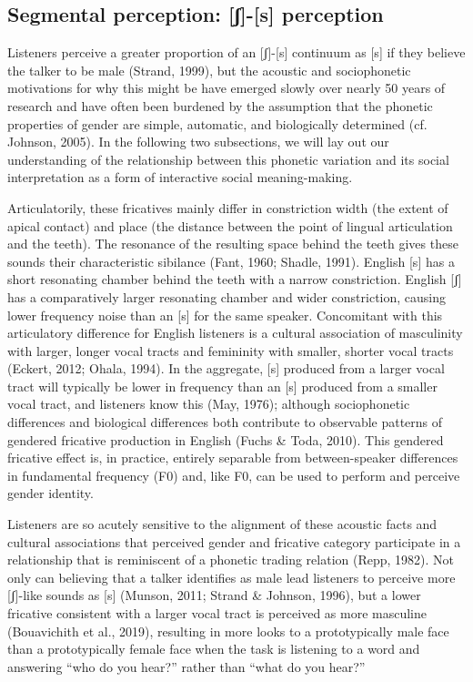 \documentclass[
  letterpaper,
  DIV=11,
  numbers=noendperiod]{scrartcl}
\begin{document}
\subsection{Segmental perception: {[}ʃ{]}-{[}s{]}
perception}\label{sec-fricative-gender}

Listeners perceive a greater proportion of an {[}ʃ{]}-{[}s{]} continuum
as {[}s{]} if they believe the talker to be male (Strand, 1999), but the
acoustic and sociophonetic motivations for why this might be have
emerged slowly over nearly 50 years of research and have often been
burdened by the assumption that the phonetic properties of gender are
simple, automatic, and biologically determined (cf. Johnson, 2005). In
the following two subsections, we will lay out our understanding of the
relationship between this phonetic variation and its social
interpretation as a form of interactive social meaning-making.

Articulatorily, these fricatives mainly differ in constriction width
(the extent of apical contact) and place (the distance between the point
of lingual articulation and the teeth). The resonance of the resulting
space behind the teeth gives these sounds their characteristic sibilance
(Fant, 1960; Shadle, 1991). English {[}s{]} has a short resonating
chamber behind the teeth with a narrow constriction. English {[}ʃ{]} has
a comparatively larger resonating chamber and wider constriction,
causing lower frequency noise than an {[}s{]} for the same speaker.
Concomitant with this articulatory difference for English listeners is a
cultural association of masculinity with larger, longer vocal tracts and
femininity with smaller, shorter vocal tracts (Eckert, 2012; Ohala,
1994). In the aggregate, {[}s{]} produced from a larger vocal tract will
typically be lower in frequency than an {[}s{]} produced from a smaller
vocal tract, and listeners know this (May, 1976); although sociophonetic
differences and biological differences both contribute to observable
patterns of gendered fricative production in English (Fuchs \& Toda,
2010). This gendered fricative effect is, in practice, entirely
separable from between-speaker differences in fundamental frequency (F0)
and, like F0, can be used to perform and perceive gender identity.

Listeners are so acutely sensitive to the alignment of these acoustic
facts and cultural associations that perceived gender and fricative
category participate in a relationship that is reminiscent of a phonetic
trading relation (Repp, 1982). Not only can believing that a talker
identifies as male lead listeners to perceive more {[}ʃ{]}-like sounds
as {[}s{]} (Munson, 2011; Strand \& Johnson, 1996), but a lower
fricative consistent with a larger vocal tract is perceived as more
masculine (Bouavichith et al., 2019), resulting in more looks to a
prototypically male face than a prototypically female face when the task
is listening to a word and answering ``who do you hear?'' rather than
``what do you hear?''
\end{document}
